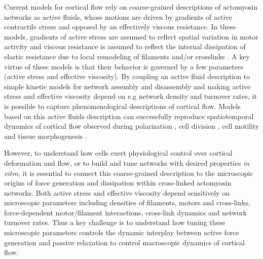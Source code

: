 \documentclass[10pt,letterpaper]{article}
\begin{document}
Current models for cortical flow rely on coarse-grained descriptions of actomyosin networks as active fluids, whose motions are driven by gradients of active contractile stress and opposed by an effectively viscous resistance\cite{cellmech_flows}.  In these models, gradients of active stress are assumed to reflect spatial variation in motor activity and viscous resistance is assumed to reflect the internal dissipation of elastic resistance due to local remodeling of filaments and/or crosslinks \cite{PhysRevLett.106.028103}.  A key virtue of these models is that their behavior is governed by a few parameters (active stress and effective viscosity).  By coupling an active fluid description to simple kinetic models for network assembly and disassembly and making active stress and effective viscosity depend on e.g network density and turnover rates, it is possible to capture phenomenological descriptions of cortical flow.  Models based on this active fluids description can successfully reproduce spatiotemporal dynamics of cortical flow observed during polarization \cite{cellmech_flows}, cell division \cite{Turlier2014114,PhysRevLett.103.058102}, cell motility \cite{Keren:2009aa,RevModPhys.85.1143} and tissue morphogenesis \cite{Heisenberg2013948}.  

However, to understand how cells exert physiological control over cortical deformation and flow, or to build and tune networks with desired properties {\em in vitro}, it is essential to connect this coarse-grained description to the microscopic origins of force generation and dissipation within cross-linked actomyosin networks.  Both active stress and effective viscosity depend sensitively on microscopic parameters including densities of filaments, motors and cross-links, force-dependent motor/filament interactions, cross-link dynamics and network turnover rates.  Thus a key challenge is to understand how tuning these microscopic parameters controls the dynamic interplay between active force generation and passive relaxation to control macroscopic dynamics of cortical flow.
\end{document}
